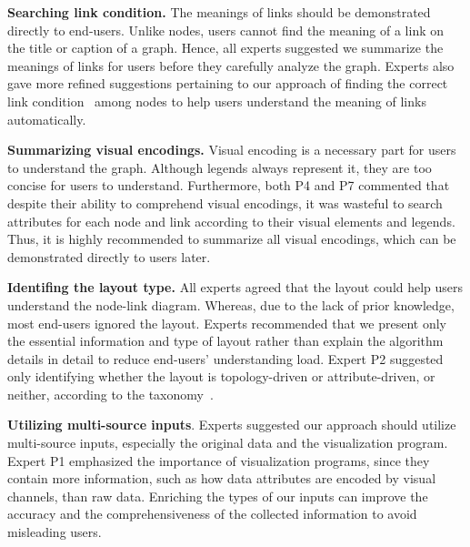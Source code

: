 \begin{compactenum}[\textbf{E}1]
    \item {\bf Searching link condition.} The meanings of links should be demonstrated directly to end-users. Unlike nodes, users cannot find the meaning of a link on the title or caption of a graph. Hence, all experts suggested we summarize the meanings of links for users before they carefully analyze the graph. Experts also gave more refined suggestions pertaining to our approach of finding the correct link condition~\cite{DBLP:journals/ivs/LiuNS14, DBLP:journals/ivs/HeerP14, DBLP:journals/tvcg/SrinivasanPEB18} among nodes to help users understand the meaning of links automatically.
    
    \item {\bf Summarizing visual encodings.} Visual encoding is a necessary part for users to understand the graph. Although legends always represent it, they are too concise for users to understand. Furthermore, both P4 and P7 commented that despite their ability to comprehend visual encodings, it was wasteful to search attributes for each node and link according to their visual elements and legends. Thus, it is highly recommended to summarize all visual encodings, which can be demonstrated directly to users later.
    
    \item {\bf Identifing the layout type.} All experts agreed that the layout could help users understand the node-link diagram. Whereas, due to the lack of prior knowledge, most end-users ignored the layout. Experts recommended that we present only the essential information and type of layout rather than explain the algorithm details in detail to reduce end-users' understanding load. Expert P2  suggested only identifying whether the layout is topology-driven or attribute-driven, or neither, according to the taxonomy~\cite{DBLP:journals/cgf/NobreMSL19}. 
    
    \item {\bf Utilizing multi-source inputs}. Experts suggested our approach should utilize multi-source inputs, especially the original data and the visualization program. Expert P1 emphasized the importance of visualization programs, since they contain more information, such as how data attributes are encoded by visual channels, than raw data. Enriching the types of our inputs can improve the accuracy and the comprehensiveness of the collected information to avoid misleading users.
\end{compactenum}

